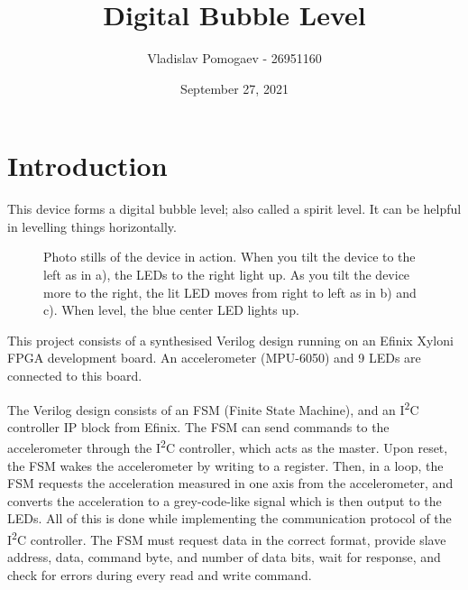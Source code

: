 \documentclass[11pt]{article}
\title{Digital Bubble Level}
\author{Vladislav Pomogaev - 26951160}
\date{September 27, 2021}
\begin{document}
\maketitle

\section{Introduction}
This device forms a digital bubble level; also called a spirit level. It can be helpful in levelling things horizontally.
\begin{figure}[H]
    \centering
    \caption{Photo stills of the device in action. When you tilt the device to the left as in a), the LEDs to the right light up. As you tilt the device more to the right, the lit LED moves from right to left as in b) and c). When level, the blue center LED lights up.}
\end{figure}

This project consists of a synthesised Verilog design running on an Efinix Xyloni FPGA development board. An accelerometer (MPU-6050) and 9 LEDs are connected to this board.

The Verilog design consists of an FSM (Finite State Machine), and an I\textsuperscript{2}C controller IP block from Efinix. The FSM can send commands to the accelerometer through the I\textsuperscript{2}C controller, which acts as the master. Upon reset, the FSM wakes the accelerometer by writing to a register. Then, in a loop, the FSM requests the acceleration measured in one axis from the accelerometer, and converts the acceleration to a grey-code-like signal which is then output to the LEDs. All of this is done while implementing the communication protocol of the I\textsuperscript{2}C controller. The FSM must request data in the correct format, provide slave address, data, command byte, and number of data bits, wait for response, and check for errors during every read and write command.
\end{document}
